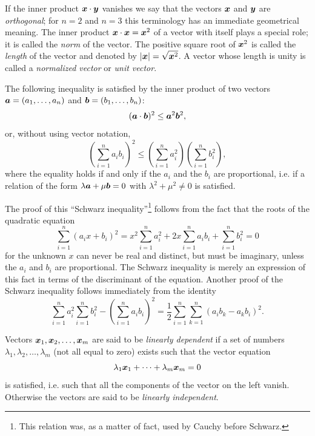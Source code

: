 If the inner product $\bm{x}\cdot\bm{y}$ vanishes we say that the vectors $\bm{x}$ and $\bm{y}$ are \emph{orthogonal}; for $n=2$ and $n=3$ this terminology has an immediate geometrical meaning. The inner product $\bm{x}\cdot\bm{x}=\bm{x}^{2}$ of a vector with itself plays a special role; it is called the \emph{norm} of the vector. The positive square root of $\bm{x}^{2}$ is called the \emph{length} of the vector and denoted by $|\bm{x}|=\sqrt{\bm{x}^{2}}$. A vector whose length is unity is called a \emph{normalized vector} or \emph{unit vector}.

The following inequality is satisfied by the inner product of two vectors $\bm{a}=(a_1,\ldots,a_n)$ and $\bm{b}=(b_1,\ldots,b_n)$:
\[
(\bm{a}\cdot\bm{b})^2\le \bm{a}^{2}\bm{b}^{2},
\]
or, without using vector notation,
\[
\left(\sum_{i=1}^{n}a_i b_i\right)^2\le
\left(\sum_{i=1}^{n}a_i^2\right)
\left(\sum_{i=1}^{n}b_i^2\right),
\]
where the equality holds if and only if the $a_i$ and the $b_i$ are proportional, i.e. if a relation of the form $\lambda\bm{a}+\mu\bm{b}=0$ with $\lambda^2+\mu^2\ne0$ is satisfied.

The proof of this ``Schwarz inequality''\footnote{This relation was, as a matter of fact, used by Cauchy before Schwarz.} follows from the fact that the roots of the quadratic equation
\[
\sum_{i=1}^{n}(a_i x+b_i)^2
=x^2\sum_{i=1}^{n}a_i^2+2x\sum_{i=1}^{n}a_i b_i+\sum_{i=1}^{n}b_i^2=0
\]
for the unknown $x$ can never be real and distinct, but must be imaginary, unless the $a_i$ and $b_i$ are proportional. The Schwarz inequality is merely an expression of this fact in terms of the discriminant of the equation. Another proof of the Schwarz inequality follows immediately from the identity
\[
\sum_{i=1}^{n}a_i^2\sum_{i=1}^{n}b_i^2-
\left(\sum_{i=1}^{n}a_i b_i\right)^2
=\frac12\sum_{i=1}^{n}\sum_{k=1}^{n}(a_i b_k-a_k b_i)^2.
\]

Vectors $\bm{x}_1,\bm{x}_2,\ldots,\bm{x}_m$ are said to be \emph{linearly dependent} if a set of numbers $\lambda_1,\lambda_2,\ldots,\lambda_m$ (not all equal to zero) exists such that the vector equation
\[
\lambda_1\bm{x}_1+\cdots+\lambda_m\bm{x}_m=0
\]
is satisfied, i.e. such that all the components of the vector on the left vanish. Otherwise the vectors are said to be \emph{linearly independent}.

